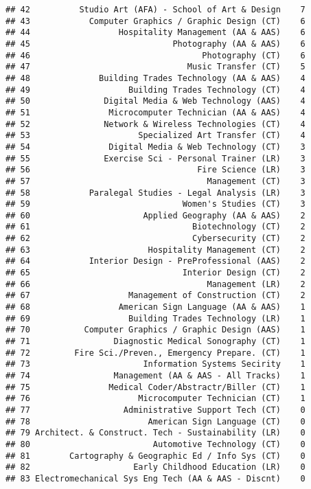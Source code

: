 \documentclass[]{article}
\begin{document}
\begin{verbatim}
## 42          Studio Art (AFA) - School of Art & Design    7
## 43            Computer Graphics / Graphic Design (CT)    6
## 44                  Hospitality Management (AA & AAS)    6
## 45                             Photography (AA & AAS)    6
## 46                                   Photography (CT)    6
## 47                                Music Transfer (CT)    5
## 48              Building Trades Technology (AA & AAS)    4
## 49                    Building Trades Technology (CT)    4
## 50               Digital Media & Web Technology (AAS)    4
## 51                Microcomputer Technician (AA & AAS)    4
## 52               Network & Wireless Technologies (CT)    4
## 53                      Specialized Art Transfer (CT)    4
## 54                Digital Media & Web Technology (CT)    3
## 55               Exercise Sci - Personal Trainer (LR)    3
## 56                                  Fire Science (LR)    3
## 57                                    Management (CT)    3
## 58            Paralegal Studies - Legal Analysis (LR)    3
## 59                               Women's Studies (CT)    3
## 60                       Applied Geography (AA & AAS)    2
## 61                                 Biotechnology (CT)    2
## 62                                 Cybersecurity (CT)    2
## 63                        Hospitality Management (CT)    2
## 64            Interior Design - PreProfessional (AAS)    2
## 65                               Interior Design (CT)    2
## 66                                    Management (LR)    2
## 67                    Management of Construction (CT)    2
## 68                  American Sign Language (AA & AAS)    1
## 69                    Building Trades Technology (LR)    1
## 70           Computer Graphics / Graphic Design (AAS)    1
## 71                 Diagnostic Medical Sonography (CT)    1
## 72         Fire Sci./Preven., Emergency Prepare. (CT)    1
## 73                       Information Systems Secirity    1
## 74                 Management (AA & AAS - All Tracks)    1
## 75                Medical Coder/Abstractr/Biller (CT)    1
## 76                      Microcomputer Technician (CT)    1
## 77                   Administrative Support Tech (CT)    0
## 78                        American Sign Language (CT)    0
## 79 Architect. & Construct. Tech - Sustainability (LR)    0
## 80                         Automotive Technology (CT)    0
## 81        Cartography & Geographic Ed / Info Sys (CT)    0
## 82                     Early Childhood Education (LR)    0
## 83 Electromechanical Sys Eng Tech (AA & AAS - Discnt)    0

\end{verbatim}
\end{document}
